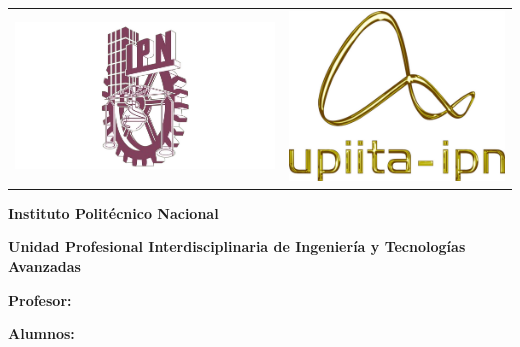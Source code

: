 \begin{titlepage}
    \noindent
    \begin{tabular}{@{} p{} p{} @{}}
        \includegraphics[width=0.8\linewidth]{./img/logo-ipn.png} &
        \hfill \includegraphics[width=0.6\linewidth]{./img/logo-upiita.png} \\
    \end{tabular}


    \centering
    \vspace*{1cm}
    {\huge \textbf{Instituto Politécnico Nacional} \par}
    {\LARGE \textbf{Unidad Profesional Interdisciplinaria de Ingeniería y Tecnologías Avanzadas} \par}
    \vspace{1.5cm}
    {\LARGE \textbf{\materia} \par} %
    \vspace{1cm}
    {\Huge \titulo \par}            %
    \vspace{2cm}
    {\large \textbf{Profesor:} \profesor \par} %
    {\large \textbf{Alumnos:} \par}     %
    {\large \alumnouno \par}
    {\large \alumnodos \par}
    {\large \alumnotres \par}
    \vfill
    {\large \textbf{\grupo} \par}       %
    
    {\large \fecha \par}            %
\end{titlepage}